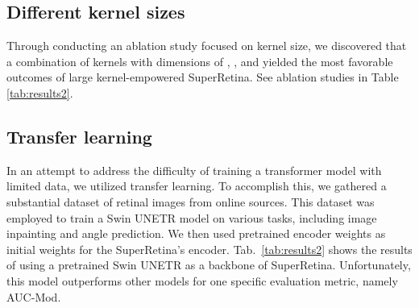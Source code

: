 \documentclass[10pt,twocolumn,letterpaper]{article}
\begin{document}
\begin{table*}
\begin{tabular}{@{}lc@{}}
\bottomrule
  \end{tabular}
  \caption{ A comparison among various techniques for retinal image matching, specifically focusing on the results obtained when testing the methods on the FIRE dataset~\cite{hernandez2017fire}. Our proposed method demonstrates superior performance when compared to both traditional and deep learning approaches. Ours-1 refers to large-kernel-empowered SuperRetina, while Ours-2 refers to Swin UNETR-empowered SuperRetina with SuperRetina as a teacher and drop out 50\%. In the table we provide the percentage values [\%] of failed, inaccurate, and acceptable.}
  \label{tab:results1}
\end{table*}

\subsection{Different kernel sizes}
Through conducting an ablation study focused on kernel size, we discovered that a combination of kernels with dimensions of , , and  yielded the most favorable outcomes of large kernel-empowered SuperRetina. See ablation studies in Table \ref{tab:results2}.

\subsection{Transfer learning}
In an attempt to address the difficulty of training a transformer model with limited data, we utilized transfer learning. To accomplish this, we gathered a substantial dataset of retinal images from online sources. This dataset was employed to train a Swin UNETR model on various tasks, including image inpainting and angle prediction. We then used pretrained encoder weights as initial weights for the SuperRetina's encoder. Tab.~\ref{tab:results2} shows the results of using a pretrained Swin UNETR as a backbone of SuperRetina. Unfortunately, this model outperforms other models for one specific evaluation metric, namely AUC-Mod.
\end{document}
